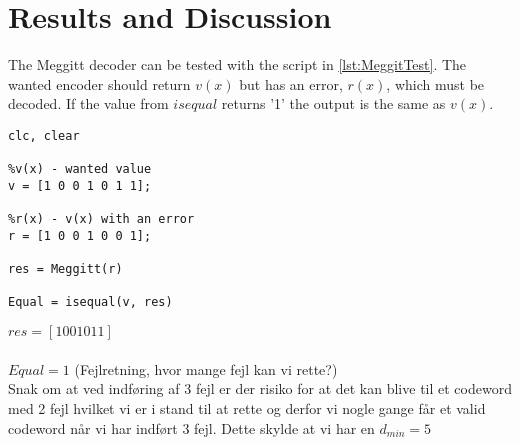 \documentclass[Main]{subfiles}
\begin{document}
\section{Results and Discussion}


The Meggitt decoder can be tested with the script in \codeTitle \ref{lst:MeggitTest}.
The wanted encoder should return $v(x)$ but has an error, $r(x)$, which must be decoded.
If the value from $isequal$ returns '1' the output is the same as $v(x)$.

\begin{lstlisting}[caption=Meggitt test script, style=Code-Matlab, label=lst:MeggitTest]
%Meggitt decoder
clc, clear

%v(x) - wanted value
v = [1 0 0 1 0 1 1];

%r(x) - v(x) with an error
r = [1 0 0 1 0 0 1];

res = Meggitt(r)

Equal = isequal(v, res)
\end{lstlisting}

$res = [1 0 0 1 0 1 1]$
\\
\\
$Equal = 1 $
(Fejlretning, hvor mange fejl kan vi rette?)\\
Snak om at ved indføring af 3 fejl er der risiko for at det kan blive til et codeword med 2 fejl hvilket vi er i stand til at rette og derfor vi nogle gange får et valid codeword når vi har indført 3 fejl. Dette skylde at vi har en $d_{min}=5$
\end{document}
